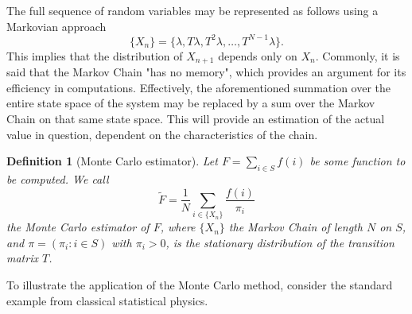 \documentclass[]{article}
\numberwithin{equation}{section}
\theoremstyle{break}
\newtheorem*{definition}{Definition}
\newcommand{\bk}{\par\null\par\noindent}
\begin{document}
The full sequence of random variables may be represented as follows using a Markovian approach
\[\{X_n\} = \{\lambda, T\lambda, T^2\lambda, \dots, T^{N-1}\lambda\}.\]
This implies that the distribution of $X_{n+1}$ depends only on $X_n$. Commonly, it is said that the Markov Chain "has no memory", which provides an argument for its efficiency in computations. Effectively, the aforementioned summation over the entire state space of the system may be replaced by a sum over the Markov Chain on that same state space. This will provide an estimation of the actual value in question, dependent on the characteristics of the chain. 

\begin{definition}[Monte Carlo estimator]
    Let $F = \sum_{i\in S}f(i)$ be some function to be computed. We call
    \[\tilde{F} = \frac{1}{N}\sum_{i\in \{X_n\}}\frac{f(i)}{\pi_i}\]
    the Monte Carlo estimator of $F$, where $\{X_n\}$ the Markov Chain of length $N$ on $S$, and $\pi = (\pi_i : i\in S)$ with $\pi_i > 0$, is the stationary distribution of the transition matrix $T$.
    \end{definition}
    
    \bk
    \noindent To illustrate the application of the Monte Carlo method, consider the standard example from classical statistical physics.
    \bk 
    
\end{document}
